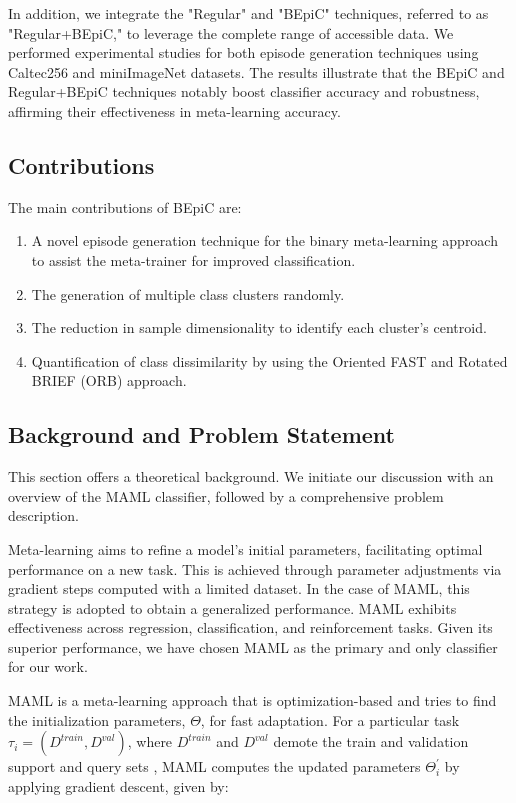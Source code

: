In addition, we integrate the "Regular" and "BEpiC" techniques, referred to as "Regular+BEpiC," to leverage the complete range of accessible data. We performed experimental studies for both episode generation techniques using Caltec256 and miniImageNet datasets. The results illustrate that the BEpiC and Regular+BEpiC techniques notably boost classifier accuracy and robustness, affirming their effectiveness in meta-learning accuracy. 

\subsection{Contributions}

The main contributions of BEpiC are:

\begin{enumerate}
    \item A novel episode generation technique for the binary meta-learning approach to assist the meta-trainer for improved classification.
    \item The generation of multiple class clusters randomly.
    \item The reduction in sample dimensionality to identify each cluster's centroid.
    \item Quantification of class dissimilarity by using the Oriented FAST and Rotated BRIEF (ORB) approach.
\end{enumerate}

\subsection{Background and Problem Statement}

This section offers a theoretical background. We initiate our discussion with an overview of the MAML classifier, followed by a comprehensive problem description.

Meta-learning aims to refine a model's initial parameters, facilitating optimal performance on a new task. This is achieved through parameter adjustments via gradient steps computed with a limited dataset. In the case of MAML, this strategy is adopted to obtain a generalized performance. MAML exhibits effectiveness across regression, classification, and reinforcement tasks. Given its superior performance, we have chosen MAML as the primary and only classifier for our work.

MAML is a meta-learning approach that is optimization-based and tries to find the initialization parameters, $\Theta$, for fast adaptation. For a particular task $\tau_{i} = (D^{train}, D^{val})$, where $D^{train}$ and $D^{val}$ demote the train and validation support and query sets \cite{DBLP:journals/corr/abs-2011-14048}, MAML computes the updated parameters $\Theta _{i}^{'}$ by applying gradient descent, given by:

